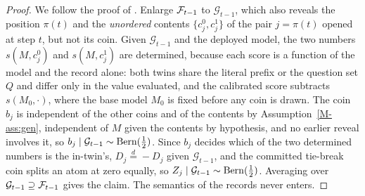 \begin{proof}
We follow the proof of \cite[Thm.~1]{dang2026vouch}. Enlarge $\mathcal{F}_{t-1}$ to $\mathcal G_{t-1}$,
which also reveals the position $\pi(t)$ and the \emph{unordered} contents
$\{c^0_j,c^1_j\}$ of the pair $j=\pi(t)$ opened at step $t$, but not its coin. Given
$\mathcal G_{t-1}$ and the deployed model, the two numbers $s(M,c^0_j)$ and
$s(M,c^1_j)$ are determined, because each score is a function of the model and the
record alone: both twins share the literal prefix or the question set $Q$ and differ only
in the value evaluated, and the calibrated score subtracts $s(M_0,\cdot)$, where the base
model $M_0$ is fixed before any coin is drawn. The coin $b_j$ is independent of the other
coins and of the contents by Assumption~\ref{M-ass:gen}, independent of $M$ given the
contents by hypothesis, and no earlier reveal involves it, so
$b_j\mid\mathcal G_{t-1}\sim\mathrm{Bern}(\frac12)$. Since $b_j$ decides which of the two
determined numbers is the in-twin's, $D_j\overset{d}{=}-D_j$ given $\mathcal G_{t-1}$,
and the committed tie-break coin splits an atom at zero equally, so
$Z_j\mid\mathcal G_{t-1}\sim\mathrm{Bern}(\frac12)$. Averaging over
$\mathcal G_{t-1}\supseteq\mathcal{F}_{t-1}$ gives the claim. The semantics of the records never
enters.
\end{proof}